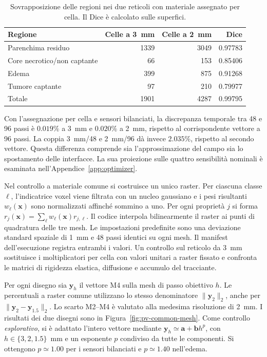 \begin{table}[!htbp]
\centering\small
\caption{Sovrapposizione delle regioni nei due reticoli con materiale assegnato per cella. Il Dice è calcolato sulle superfici.}
\label{tab:app-regioni}
\begin{tabular}{@{}lrrr@{}}\toprule
Regione & Celle a 3~mm & Celle a 2~mm & Dice\\\midrule
Parenchima residuo & 1339 & 3049 & 0.97783\\
Core necrotico/non captante & 66 & 153 & 0.85406\\
Edema & 399 & 875 & 0.91268\\
Tumore captante & 97 & 210 & 0.79977\\
Totale & 1901 & 4287 & 0.99795\\\bottomrule
\end{tabular}
\end{table}

Con l'assegnazione per cella e sensori bilanciati, la discrepanza temporale tra 48 e 96 passi è $0.019\%$ a 3~mm e $0.020\%$ a 2~mm, rispetto al corrispondente vettore a 96 passi. La coppia 3~mm/48 e 2~mm/96 dà invece $2.035\%$, rispetto al secondo vettore. Questa differenza comprende sia l'approssimazione del campo sia lo spostamento delle interfacce. La sua proiezione sulle quattro sensibilità nominali è esaminata nell'Appendice~\ref{app:optimizer}.

Nel controllo a materiale comune si costruisce un unico raster. Per ciascuna classe $\ell$, l'indicatrice voxel viene filtrata con un nucleo gaussiano e i pesi risultanti $w_\ell(\mathbf x)$ sono normalizzati affinché sommino a uno. Per ogni proprietà $j$ si forma $r_j(\mathbf x)=\sum_\ell w_\ell(\mathbf x)r_{j,\ell}$. Il codice interpola bilinearmente il raster ai punti di quadratura delle tre mesh. Le impostazioni predefinite sono una deviazione standard spaziale di 1~mm e 48 passi identici su ogni mesh. Il manifest dell'esecuzione registra entrambi i valori. Un controllo sul reticolo da 3~mm sostituisce i moltiplicatori per cella con valori unitari a raster fissato e confronta le matrici di rigidezza elastica, diffusione e accumulo del tracciante.

Per ogni disegno sia $\mathbf y_h$ il vettore M4 sulla mesh di passo obiettivo $h$. Le percentuali a raster comune utilizzano lo stesso denominatore $\|\mathbf y_2\|_2$, anche per $\|\mathbf y_2-\mathbf y_{1.5}\|_2$. Lo scarto M2--M4 è valutato alla medesima risoluzione di 2~mm. I risultati dei due disegni sono in Figura~\ref{fig:pv-common-mesh}. Come controllo \emph{esplorativo}, si è adattato l'intero vettore mediante $\mathbf y_h\simeq\mathbf a+\mathbf b h^{p}$, con $h\in\{3,2,1.5\}$~mm e un esponente $p$ condiviso da tutte le componenti. Si ottengono $p\simeq1.00$ per i sensori bilanciati e $p\simeq1.40$ nell'edema.
